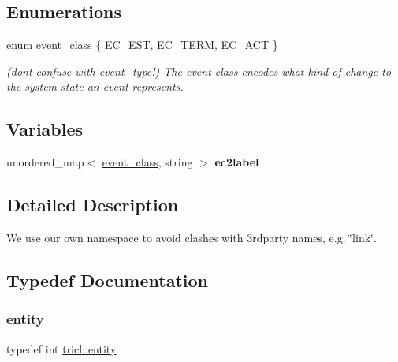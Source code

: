 \subsection*{Enumerations}
\begin{DoxyCompactItemize}
\item 
enum \hyperlink{namespacetricl_a6967089e2c0837f273d8cb5fd9f7e46d}{event\+\_\+class} \{ \hyperlink{namespacetricl_a6967089e2c0837f273d8cb5fd9f7e46da928305067790de15396de8fcc92b72b9}{E\+C\+\_\+\+E\+ST}, 
\hyperlink{namespacetricl_a6967089e2c0837f273d8cb5fd9f7e46da16f53be37a75a1cdfc726014c7f3810a}{E\+C\+\_\+\+T\+E\+RM}, 
\hyperlink{namespacetricl_a6967089e2c0837f273d8cb5fd9f7e46dac508c68c92ee059322cb644dd330bbcf}{E\+C\+\_\+\+A\+CT}
 \}\begin{DoxyCompactList}\small\item\em (don\textquotesingle{}t confuse with event\+\_\+type!) The event class encodes what kind of change to the system state an event represents. \end{DoxyCompactList}
\end{DoxyCompactItemize}
\subsection*{Variables}
\begin{DoxyCompactItemize}
\item 
unordered\+\_\+map$<$ \hyperlink{namespacetricl_a6967089e2c0837f273d8cb5fd9f7e46d}{event\+\_\+class}, string $>$ {\bfseries ec2label}
\end{DoxyCompactItemize}


\subsection{Detailed Description}
We use our own namespace to avoid clashes with 3rdparty names, e.\+g. \char`\"{}link\char`\"{}. 

\subsection{Typedef Documentation}
\mbox{\label{namespacetricl_a57273122278e8b301844e2a2e1f0742f}} 
\subsubsection{\texorpdfstring{entity}{entity}}
{\footnotesize\ttfamily typedef int \hyperlink{namespacetricl_a57273122278e8b301844e2a2e1f0742f}{tricl\+::entity}}



